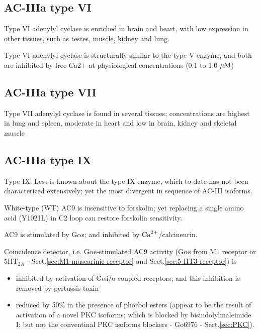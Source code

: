 \subsection{AC-IIIa type VI}

Type VI adenylyl cyclase is enriched in brain and heart, with low
expression in other tissues, such as testes, muscle, kidney and lung.
  
Type VI adenylyl cyclase is structurally similar to the type V enzyme, and
both are inhibited by free Ca2+ at physiological concentrations (0.1 to 1.0
${\mu\text{M}}$)

  
\subsection{AC-IIIa type VII}

Type VII adenylyl cyclase is found in several tissues; concentrations are
highest in lung and spleen, moderate in heart and low in brain, kidney and
skeletal muscle

\subsection{AC-IIIa type IX}
  
Type IX: Less is known about the type IX enzyme, which to date has not
been characterized extensively; yet the most divergent in sequence of AC-III
isoforms. 

White-type (WT) AC9 is insensitive to forskolin; yet replacing a single amino
acid (Y1021L) in C2 loop can restore forskolin sensitivity.

AC9 is stimulated by G$\alpha$s; and inhibited by ${\text{Ca}^{2+}}$/calcineurin.

Coincidence detector, i.e. G$\alpha$s-stimulated AC9 activity (G$\alpha$s from
M1 receptor or 5HT$_{2A}$ - Sect.\ref{sec:M1-muscarinic-receptor} and
Sect.\ref{sec:5-HT3-receptor}) is

\begin{itemize}

  \item inhibited by activation of G$\alpha$i/o-coupled receptors; and this
  inhibition is removed by pertussis toxin
  
  \item reduced by 50\% in the presence of phorbol esters (appear to be the
  result of activation of a novel PKC isoforms; which is blocked by
  bisindolylmaleimide I; but not the conventinal PKC isoforms blockers - Go6976
  - Sect.\ref{sec:PKC}).
  
\end{itemize} 


